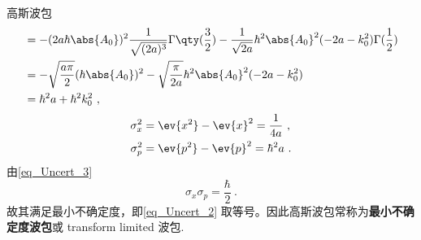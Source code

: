 \begin{example}{高斯波包}
\begin{equation}
\begin{aligned}
&=-(2a\hbar\abs{A_0})^2\frac{1}{\sqrt{(2a)^3}}\Gamma\qty(\frac{3}{2})-\frac{1}{\sqrt{2a}}\hbar^2 \abs{A_0}^2(-2a-k_0^2)\Gamma(\frac{1}{2})\\
&=-\sqrt{\frac{a\pi}{2}}(\hbar\abs{A_0})^2-\sqrt{\frac{\pi}{2a}}\hbar^2 \abs{A_0}^2(-2a-k_0^2)\\
&=\hbar^2a+\hbar^2k_0^2~,
\end{aligned}
\end{equation}
\begin{equation}\label{eq_Uncert_3}
\begin{aligned}
\sigma_x^2&=\ev{x^2}-\ev{x}^2=\frac{1}{4a}~, \\
\sigma_p^2&=\ev{p^2}-\ev{p}^2=\hbar^2a~.
\end{aligned}
\end{equation}
由\autoref{eq_Uncert_3} 
\begin{equation}
\sigma_x\sigma_p=\frac{\hbar}{2}~.
\end{equation}
故其满足最小不确定度，即\autoref{eq_Uncert_2} 取等号。因此高斯波包常称为\textbf{最小不确定度波包}或 transform limited 波包.
\end{example}














